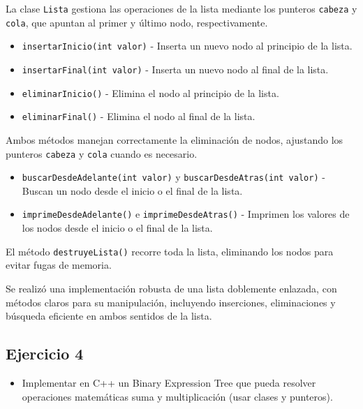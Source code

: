 \documentclass{article}
\begin{document}
        La clase \texttt{Lista} gestiona las operaciones de la lista mediante los punteros \texttt{cabeza} y \texttt{cola}, que apuntan al primer y último nodo, respectivamente.
        
        \begin{itemize}
            \item \texttt{insertarInicio(int valor)} - Inserta un nuevo nodo al principio de la lista.
            \item \texttt{insertarFinal(int valor)} - Inserta un nuevo nodo al final de la lista.
        \end{itemize}
        
        \begin{itemize}
            \item \texttt{eliminarInicio()} - Elimina el nodo al principio de la lista.
            \item \texttt{eliminarFinal()} - Elimina el nodo al final de la lista.
        \end{itemize}
        Ambos métodos manejan correctamente la eliminación de nodos, ajustando los punteros \texttt{cabeza} y \texttt{cola} cuando es necesario.
        
        \begin{itemize}
            \item \texttt{buscarDesdeAdelante(int valor)} y \texttt{buscarDesdeAtras(int valor)} - Buscan un nodo desde el inicio o el final de la lista.
            \item \texttt{imprimeDesdeAdelante()} e \texttt{imprimeDesdeAtras()} - Imprimen los valores de los nodos desde el inicio o el final de la lista.
        \end{itemize}
        
        El método \texttt{destruyeLista()} recorre toda la lista, eliminando los nodos para evitar fugas de memoria.
        
        Se realizó una implementación robusta de una lista doblemente enlazada, con métodos claros para su manipulación, incluyendo inserciones, eliminaciones y búsqueda eficiente en ambos sentidos de la lista.
        


        \subsection{Ejercicio 4}
        \begin{itemize}
            \item Implementar en C++ un Binary Expression Tree que pueda resolver operaciones matemáticas suma y multiplicación (usar clases y punteros).
        \end{itemize}  
        
\end{document}
